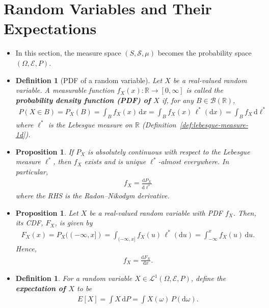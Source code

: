 \documentclass[10pt]{article}
\newtheorem{definition}[lemma]{Definition}
\newtheorem{proposition}[lemma]{Proposition}
\numberwithin{lemma}{section}
\newcommand{\dee}{\mathrm{d}}
\newcommand{\mcal}[1]{\mathcal{#1}}
\newcommand{\Real}{\mathbb{R}}
\begin{document}
\section{Random Variables and Their Expectations}

\begin{itemize}
  \item In this section, the measure space $(S,\mcal{S},\mu)$ becomes the probability space $(\Omega,\mcal{E},P)$.
 
  \item \begin{definition}[PDF of a random variable]
    Let $X$ be a real-valued random variable. A measurable function $f_X(x): \Real \rightarrow [0, \infty]$ is called the {\bf probability density function (PDF) of $X$} if, for any $B \in \mcal{B}(\Real)$,
    \begin{align*}
      P(X \in B) = P_X(B) = \int_B f_X(x)\, \dee x = \int_B f_X(x)\, \ell^*(\dee x) = \int_B f_X\, \dee\ell^* 
    \end{align*}  
    where $\ell^*$ is the Lebesgue measure on $\Real$ (Definition~\ref{def:lebesgue-measure-1d}).    
  \end{definition}

  \item \begin{proposition}
    If $P_X$ is absolutely continuous with respect to the Lebesgue measure $\ell^*$, then $f_X$ exists and is unique $\ell^*$-almost everywhere. In particular,
    \begin{align*}
      f_X = \frac{\dee P_X}{\dee \ell^*}
    \end{align*}
    where the RHS is the Radon--Nikodym derivative.
  \end{proposition}

  \item \begin{proposition}
    Let $X$ be a real-valued random variable with PDF $f_X$. Then, its CDF, $F_X$, is given by
    \begin{align*}
      F_X(x) = P_X((-\infty,x]) = \int_{(-\infty,x]} f_X(u)\, \ell^*(\dee u) = \int_{-\infty}^x f_X(u)\, \dee u.
    \end{align*}
    Hence,
    \begin{align*}
      f_X = \frac{\dee F_X}{\dee x}.
    \end{align*}
  \end{proposition}

  \item \begin{definition}
    For a random variable $X \in \mcal{L}^1(\Omega,\mcal{E},P)$, define the {\bf expectation of $X$} to be
    \begin{align*}
      E[X] = \int X\, \dee P = \int X(\omega)\, P(\dee \omega).
    \end{align*}
  \end{definition}


\end{itemize}
\end{document}
